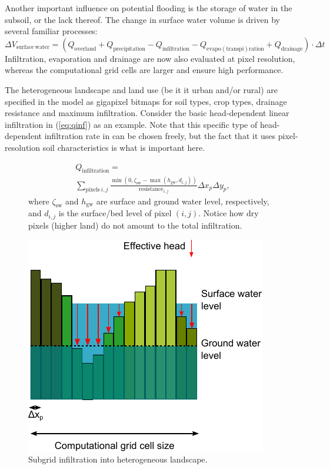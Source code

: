 \documentclass[a4paper]{article}
\begin{document}
Another important influence on potential flooding is the storage of water in the subsoil, or the lack thereof. The change in surface water volume is driven by several familiar processes:
\[
\Delta V_\mathrm{surface\ water}=(Q_\mathrm{overland} + Q_\mathrm{precipitation} - Q_\mathrm{infiltration} - Q_\mathrm{evapo(transpi)ration} + Q_\mathrm{drainage})\cdot\Delta t
\]
Infiltration, evaporation and drainage are now also evaluated at pixel resolution, whereas the computational grid cells are larger and ensure high performance.

The heterogeneous landscape and land use (be it it urban and/or rural) are specified in the model as gigapixel bitmaps for soil types, crop types, drainage resistance and maximum infiltration. Consider the basic head-dependent linear infiltration in (\ref{eq:qinf}) as an example. Note that this specific type of head-dependent infiltration rate in can be chosen freely, but the fact that it uses pixel-resolution soil characteristics is what is important here.
%
\begin{figure}[h]
\begin{minipage}[b]{0.55\linewidth}
\begin{multline}
\label{eq:qinf}
Q_\mathrm{infiltration}=\\
\sum_{\mathrm{pixels}\ i,j} \frac{\min(0, \zeta_\mathrm{sw}-\max(h_\mathrm{gw}, d_{i,j}))}{\mathrm{resistance}_{i,j}}\Delta x_p \Delta y_p,
\end{multline}
where $\zeta_\mathrm{sw}$ and $h_\mathrm{gw}$ are surface and ground water level, respectively, and $d_{i,j}$ is the surface/bed level of pixel $(i,j)$. Notice how dry pixels (higher land) do not amount to the total infiltration.

\end{minipage}
\hspace{0.5cm}
\begin{minipage}[t]{0.4\linewidth}
\centering
\includegraphics[width=\textwidth]{subgrid_hydrology}
\caption{Subgrid infiltration into heterogeneous landscape.}
\label{fig:figure2}
\end{minipage}
\end{figure}
\end{document}
